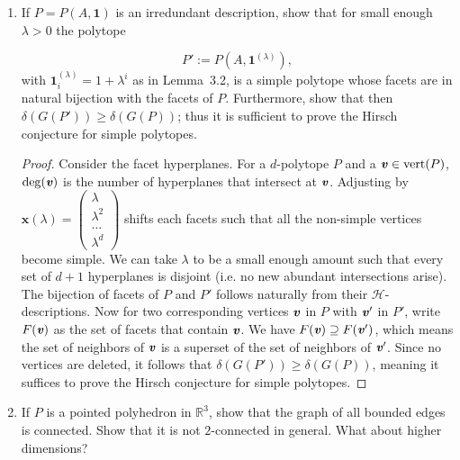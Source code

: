 \documentclass{article}
\begin{document}
\begin{enumerate}
\begin{solution}
\begin{enumerate}[label=(\roman*)]
\item 


\begin{remark}
    In part (iv) Ziegler means the $d$-cubes, with $d \geq 5$. In part (ii) we show that lower dimensional cubes are not ambiguous ($d$-cubes are simple polytopes). 
\end{remark}

\end{enumerate}
\end{solution}

\item If $P = P(A,\textbf{1})$ is an irredundant description, show that for small enough $\lambda > 0$ the polytope

\[P' := P(A,\textbf{1}^{(\lambda)}),\]
with $\textbf{1}^{(\lambda)}_i = 1 + \lambda^i$ as in Lemma~3.2, is a simple polytope whose facets are in natural bijection with the facets of $P$. Furthermore, show that then $\delta(G(P')) \ge \delta(G(P))$; thus it is sufficient to prove the Hirsch conjecture for simple polytopes.

\begin{proof}
    Consider the facet hyperplanes. For a $d$-polytope $P$ and a $\textbf{\textit{v}} \in \operatorname{vert}(P)$, $\deg(\textbf{\textit{v}})$ is the number of hyperplanes that intersect at $\textbf{\textit{v}}$. Adjusting by $\textbf{x}(\lambda) = \begin{pmatrix}
        \lambda \\ \lambda^2 \\ \ldots \\ \lambda^d
    \end{pmatrix}$ shifts each facets such that all the non-simple vertices become simple. We can take $\lambda$ to be a small enough amount such that every set of $d+1$ hyperplanes is disjoint (i.e. no new abundant intersections arise). The bijection of facets of $P$ and $P'$ follows naturally from their $\mathcal{H}$-descriptions. Now for two corresponding vertices $\textbf{\textit{v}}$ in $P$ with $\textbf{\textit{v}}'$ in $P'$, write $F(\textbf{\textit{v}})$ as the set of facets that contain $\textbf{\textit{v}}$. We have $F(\textbf{\textit{v}}) \supseteq F(\textbf{\textit{v}}')$, which means the set of neighbors of $\textbf{\textit{v}}$ is a superset of the set of neighbors of $\textbf{\textit{v}}'$. Since no vertices are deleted, it follows that $\delta(G(P')) \ge \delta(G(P))$, meaning it suffices to prove the Hirsch conjecture for simple polytopes.
\end{proof}

\item If $P$ is a pointed polyhedron in $\mathbb{R}^3$, show that the graph of all bounded edges is connected. Show that it is not $2$-connected in general. What about higher dimensions?


\end{enumerate}
\end{document}
